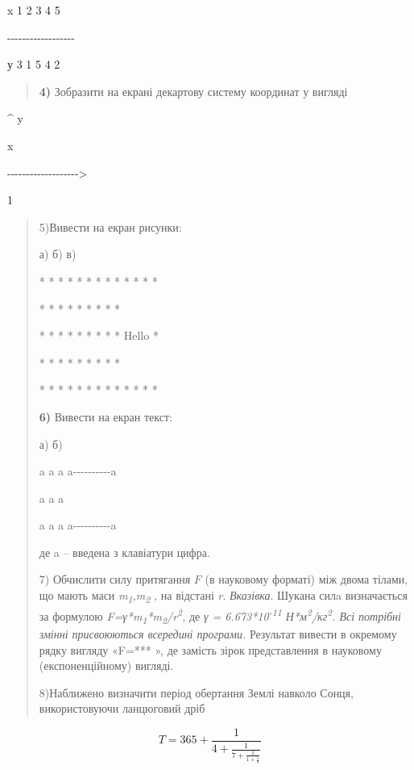 \documentclass[]{article}
\begin{document}
x \textbar{} 1 \textbar{} 2 \textbar{} 3 \textbar{} 4 \textbar{} 5

-\/-\/-\/-\/-\/-\/-\/-\/-\/-\/-\/-\/-\/-\/-\/-\/-\/-

у \textbar{} 3 \textbar{} 1 \textbar{} 5 \textbar{} 4 \textbar{} 2

\begin{quote}
\textbf{4)} Зобразити на екрані декартову систему координат у вигляді
\end{quote}

\^{} y

\textbar{} x

-\/-\/-\/-\/-\/-\/-\/-\/-\/-\/-\/-\/-\/-\/-\/-\/-\/-\/-\textgreater{}

\textbar{} 1

\textbar{}

\begin{quote}
5)Вивести на екран рисунки:

а) б) в)

* * * * * * * * * * * * *

* * * * * * * * *

* * * * * * * * * Hello *

* * * * * * * * *

* * * * * * * * * * * * *

\textbf{6)} Вивести на екран текст:

а) б)

a a a a-\/-\/-\/-\/-\/-\/-\/-\/-\/-a

a a \textbar{} a \textbar{}

a a a a-\/-\/-\/-\/-\/-\/-\/-\/-\/-a

де a -- введена з клавіатури цифра.

7) Обчислити силу притягання \(F\) (в науковому форматі) між двома
тілами, що мають маси \emph{m\textsubscript{1},m\textsubscript{2}}
\emph{,} на відстані \emph{r}. \emph{\emph{Вказівка}}. Шукана силa
визначається за формулою
\emph{F=γ*m\textsubscript{1}*m\textsubscript{2}/r\textsuperscript{2},}
де \emph{γ = 6.673*10\textsuperscript{-11}
Н*м\textsuperscript{2}/кг\textsuperscript{2}. Всі потрібні змінні
присвоюються всередині програми.} Результат вивести в окремому рядку
вигляду «F=*** », де замість зірок представлення в науковому
(експоненційному) вигляді.

8)Наближено визначити період обертання Землі навколо Сонця,
використовуючи ланцюговий дріб
\end{quote}

\[T = \mathrm{365} + \frac{1}{4 + \frac{1}{7 + \frac{1}{1 + \frac{1}{3}}}}\]
\end{document}
